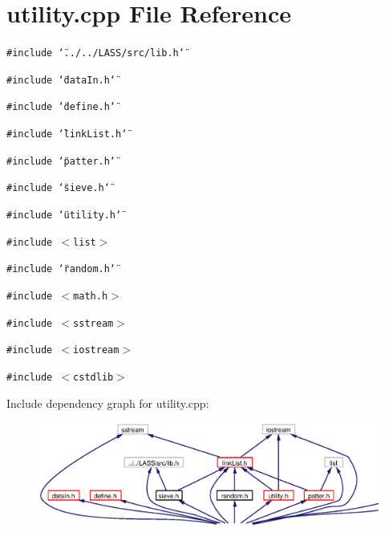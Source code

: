 \section{utility.cpp File Reference}
\label{utility_8cpp}
{\tt \#include \char`\"{}../../LASS/src/lib.h\char`\"{}}\par
{\tt \#include \char`\"{}data\-In.h\char`\"{}}\par
{\tt \#include \char`\"{}define.h\char`\"{}}\par
{\tt \#include \char`\"{}link\-List.h\char`\"{}}\par
{\tt \#include \char`\"{}patter.h\char`\"{}}\par
{\tt \#include \char`\"{}sieve.h\char`\"{}}\par
{\tt \#include \char`\"{}utility.h\char`\"{}}\par
{\tt \#include $<$list$>$}\par
{\tt \#include \char`\"{}random.h\char`\"{}}\par
{\tt \#include $<$math.h$>$}\par
{\tt \#include $<$sstream$>$}\par
{\tt \#include $<$iostream$>$}\par
{\tt \#include $<$cstdlib$>$}\par


Include dependency graph for utility.cpp:\begin{figure}[H]
\begin{center}
\leavevmode
\includegraphics[width=359pt]{utility_8cpp__incl}
\end{center}
\end{figure}
